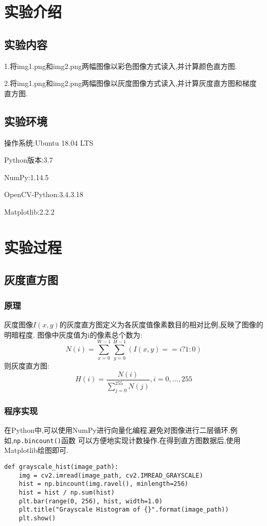 \documentclass[a4paper]{article}
\begin{document}
    \tableofcontents
    \newpage
    \section{实验介绍}
        \subsection{实验内容}
1.将img1.png和img2.png两幅图像以彩色图像方式读入,并计算颜色直方图.

2.将img1.png和img2.png两幅图像以灰度图像方式读入,并计算灰度直方图和梯度直方图.
        \subsection{实验环境}
操作系统:Ubuntu 18.04 LTS

Python版本:3.7

NumPy:1.14.5

OpenCV-Python:3.4.3.18

Matplotlib:2.2.2
    \newpage
    \section{实验过程}
        \subsection{灰度直方图}
            \subsubsection{原理}
灰度图像$I(x,y)$的灰度直方图定义为各灰度值像素数目的相对比例,反映了图像的明暗程度.
图像中灰度值为i的像素总个数为:
$$N(i) = \sum_{x=0}^{W-1}\sum_{y=0}^{H-1}(I(x,y)==i?1:0)$$
则灰度直方图:
$$H(i)=\frac{N(i)}{\sum_{j=0}^{255}N(j)},i=0,\dots,255$$
            \subsubsection{程序实现}
在Python中,可以使用NumPy进行向量化编程,避免对图像进行二层循环.例如,\texttt{np.bincount()}函数
可以方便地实现计数操作.在得到直方图数据后,使用Matplotlib绘图即可.
\begin{verbatim}
def grayscale_hist(image_path):
    img = cv2.imread(image_path, cv2.IMREAD_GRAYSCALE)
    hist = np.bincount(img.ravel(), minlength=256)
    hist = hist / np.sum(hist)
    plt.bar(range(0, 256), hist, width=1.0)
    plt.title("Grayscale Histogram of {}".format(image_path))
    plt.show()
\end{verbatim}
\end{document}
